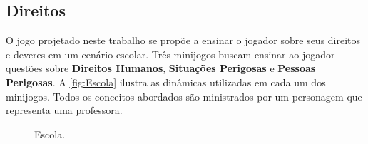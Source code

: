 \subsection{Direitos}\label{subsec:2}

O jogo projetado neste trabalho se propõe a ensinar o jogador sobre seus direitos e deveres em um cenário escolar. Três minijogos buscam ensinar ao jogador questões sobre \textbf{Direitos Humanos}, \textbf{Situações Perigosas} e \textbf{Pessoas Perigosas}. A \autoref{fig:Escola} ilustra as dinâmicas utilizadas em cada um dos minijogos. Todos os conceitos abordados são ministrados por um personagem que representa uma professora. 

\begin{figure}%
  \vspace{-20pt}
  \caption{\label{fig:Escola}Escola.}

\end{figure}
